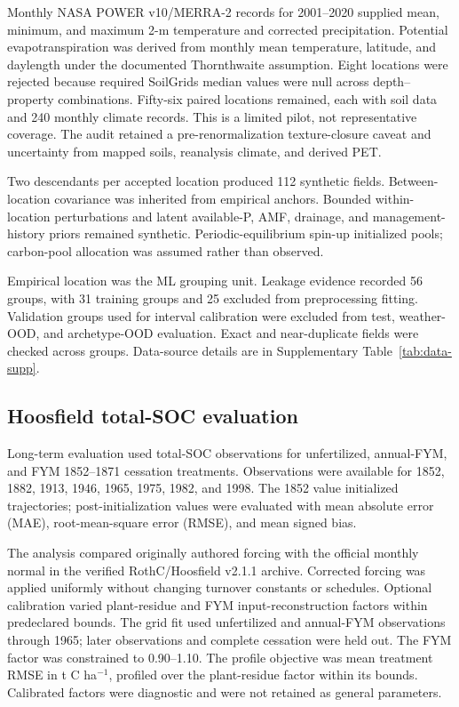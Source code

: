 \documentclass[11pt]{article}
\newcommand{\unitC}{t C ha$^{-1}$}
\begin{document}
Monthly NASA POWER v10/MERRA-2 records for 2001--2020 supplied mean, minimum, and maximum 2-m temperature and corrected precipitation. Potential evapotranspiration was derived from monthly mean temperature, latitude, and daylength under the documented Thornthwaite assumption. Eight locations were rejected because required SoilGrids median values were null across depth--property combinations. Fifty-six paired locations remained, each with soil data and 240 monthly climate records. This is a limited pilot, not representative coverage. The audit retained a pre-renormalization texture-closure caveat and uncertainty from mapped soils, reanalysis climate, and derived PET.

Two descendants per accepted location produced 112 synthetic fields. Between-location covariance was inherited from empirical anchors. Bounded within-location perturbations and latent available-P, AMF, drainage, and management-history priors remained synthetic. Periodic-equilibrium spin-up initialized pools; carbon-pool allocation was assumed rather than observed.

Empirical location was the ML grouping unit. Leakage evidence recorded 56 groups, with 31 training groups and 25 excluded from preprocessing fitting. Validation groups used for interval calibration were excluded from test, weather-OOD, and archetype-OOD evaluation. Exact and near-duplicate fields were checked across groups. Data-source details are in Supplementary Table~\ref{tab:data-supp}.

\subsection{Hoosfield total-SOC evaluation}

Long-term evaluation used total-SOC observations for unfertilized, annual-FYM, and FYM 1852--1871 cessation treatments. Observations were available for 1852, 1882, 1913, 1946, 1965, 1975, 1982, and 1998. The 1852 value initialized trajectories; post-initialization values were evaluated with mean absolute error (MAE), root-mean-square error (RMSE), and mean signed bias.

The analysis compared originally authored forcing with the official monthly normal in the verified RothC/Hoosfield v2.1.1 archive. Corrected forcing was applied uniformly without changing turnover constants or schedules. Optional calibration varied plant-residue and FYM input-reconstruction factors within predeclared bounds. The grid fit used unfertilized and annual-FYM observations through 1965; later observations and complete cessation were held out. The FYM factor was constrained to 0.90--1.10. The profile objective was mean treatment RMSE in \unitC{}, profiled over the plant-residue factor within its bounds. Calibrated factors were diagnostic and were not retained as general parameters.
\end{document}
